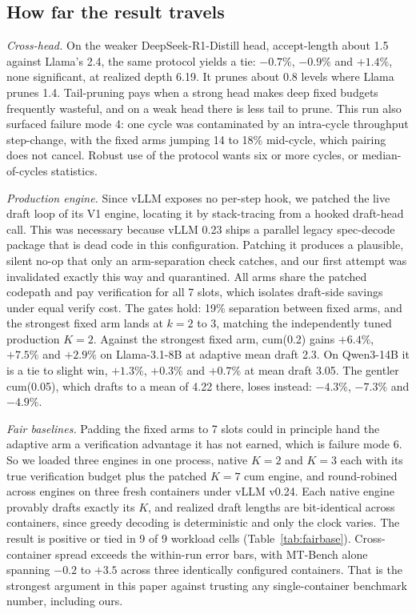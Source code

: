 \documentclass[conference]{IEEEtran}
\begin{document}
\subsection{How far the result travels}
\emph{Cross-head.} On the weaker DeepSeek-R1-Distill head, accept-length about 1.5 against
Llama's 2.4, the same protocol yields a tie: $-0.7\%$, $-0.9\%$ and $+1.4\%$, none
significant, at realized depth 6.19. It prunes about 0.8 levels where Llama prunes 1.4.
Tail-pruning pays when a strong head makes deep fixed budgets frequently wasteful, and on a
weak head there is less tail to prune. This run also surfaced failure mode 4: one cycle was
contaminated by an intra-cycle throughput step-change, with the fixed arms jumping 14 to 18\%
mid-cycle, which pairing does not cancel. Robust use of the protocol wants six or more cycles,
or median-of-cycles statistics.

\emph{Production engine.} Since vLLM exposes no per-step hook, we patched the live draft loop
of its V1 engine, locating it by stack-tracing from a hooked draft-head call. This was necessary because vLLM 0.23 ships a parallel legacy spec-decode package that is dead code in
this configuration. Patching it produces a plausible, silent no-op that only an arm-separation
check catches, and our first attempt was invalidated exactly this way and quarantined. All
arms share the patched codepath and pay verification for all 7 slots, which isolates
draft-side savings under equal verify cost. The gates hold: 19\% separation between fixed
arms, and the strongest fixed arm lands at $k{=}2$ to $3$, matching the independently tuned
production $K{=}2$. Against the strongest fixed arm, cum(0.2) gains $+6.4\%$, $+7.5\%$ and
$+2.9\%$ on Llama-3.1-8B at adaptive mean draft 2.3. On Qwen3-14B it is a tie to slight win,
$+1.3\%$, $+0.3\%$ and $+0.7\%$ at mean draft 3.05. The gentler cum(0.05), which drafts to a
mean of 4.22 there, loses instead: $-4.3\%$, $-7.3\%$ and $-4.9\%$.

\emph{Fair baselines.} Padding the fixed arms to 7 slots could in principle hand the adaptive
arm a verification advantage it has not earned, which is failure mode 6. So we loaded three
engines in one process, native $K{=}2$ and $K{=}3$ each with its true verification budget plus
the patched $K{=}7$ cum engine, and round-robined across engines on three fresh containers
under vLLM v0.24. Each native engine provably drafts exactly its $K$, and realized draft
lengths are bit-identical across containers, since greedy decoding is deterministic and only
the clock varies. The result is positive or tied in 9 of 9 workload cells
(Table~\ref{tab:fairbase}). Cross-container spread exceeds the within-run error bars, with
MT-Bench alone spanning $-0.2$ to $+3.5$ across three identically configured containers. That
is the strongest argument in this paper against trusting any single-container benchmark
number, including ours.
\end{document}
